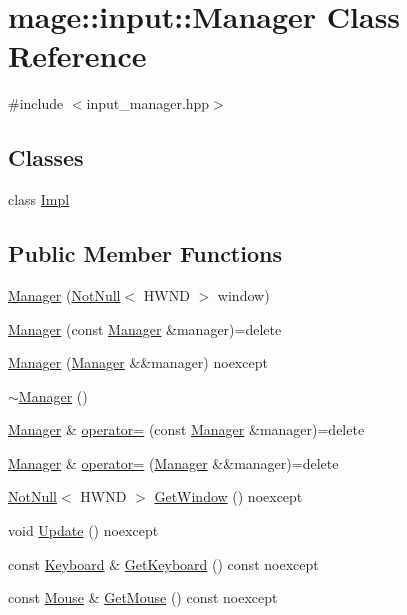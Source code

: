 \hypertarget{classmage_1_1input_1_1_manager}{}\section{mage\+:\+:input\+:\+:Manager Class Reference}
\label{classmage_1_1input_1_1_manager}


{\ttfamily \#include $<$input\+\_\+manager.\+hpp$>$}

\subsection*{Classes}
\begin{DoxyCompactItemize}
\item 
class \hyperlink{classmage_1_1input_1_1_manager_1_1_impl}{Impl}
\end{DoxyCompactItemize}
\subsection*{Public Member Functions}
\begin{DoxyCompactItemize}
\item 
\hyperlink{classmage_1_1input_1_1_manager_a58ecd18389d84fb46109f3b28d105879}{Manager} (\hyperlink{namespacemage_a8769f9d670d6b585ea306cb1062af94b}{Not\+Null}$<$ H\+W\+ND $>$ window)
\item 
\hyperlink{classmage_1_1input_1_1_manager_a345b3b9384e5a3f31ff183e5208fa56b}{Manager} (const \hyperlink{classmage_1_1input_1_1_manager}{Manager} \&manager)=delete
\item 
\hyperlink{classmage_1_1input_1_1_manager_ab4aae9f96e63bdb8d4ab0de08932b2eb}{Manager} (\hyperlink{classmage_1_1input_1_1_manager}{Manager} \&\&manager) noexcept
\item 
\hyperlink{classmage_1_1input_1_1_manager_a2fa35df15cecee8c6842e97912f80edd}{$\sim$\+Manager} ()
\item 
\hyperlink{classmage_1_1input_1_1_manager}{Manager} \& \hyperlink{classmage_1_1input_1_1_manager_a5fb8b5797f2048cf31fb4c2a05ba5d02}{operator=} (const \hyperlink{classmage_1_1input_1_1_manager}{Manager} \&manager)=delete
\item 
\hyperlink{classmage_1_1input_1_1_manager}{Manager} \& \hyperlink{classmage_1_1input_1_1_manager_a09047a5d857027368bc731763f8b5ece}{operator=} (\hyperlink{classmage_1_1input_1_1_manager}{Manager} \&\&manager)=delete
\item 
\hyperlink{namespacemage_a8769f9d670d6b585ea306cb1062af94b}{Not\+Null}$<$ H\+W\+ND $>$ \hyperlink{classmage_1_1input_1_1_manager_aca0295dd551eba67329740599a80f24d}{Get\+Window} () noexcept
\item 
void \hyperlink{classmage_1_1input_1_1_manager_a89934adcb3da215d5162bd0d30e48a9d}{Update} () noexcept
\item 
const \hyperlink{classmage_1_1input_1_1_keyboard}{Keyboard} \& \hyperlink{classmage_1_1input_1_1_manager_abd444400d2540d8cb4615cc7c47a72dd}{Get\+Keyboard} () const noexcept
\item 
const \hyperlink{classmage_1_1input_1_1_mouse}{Mouse} \& \hyperlink{classmage_1_1input_1_1_manager_a30cc36d7250842522b34a76e3f785f8a}{Get\+Mouse} () const noexcept
\end{DoxyCompactItemize}
